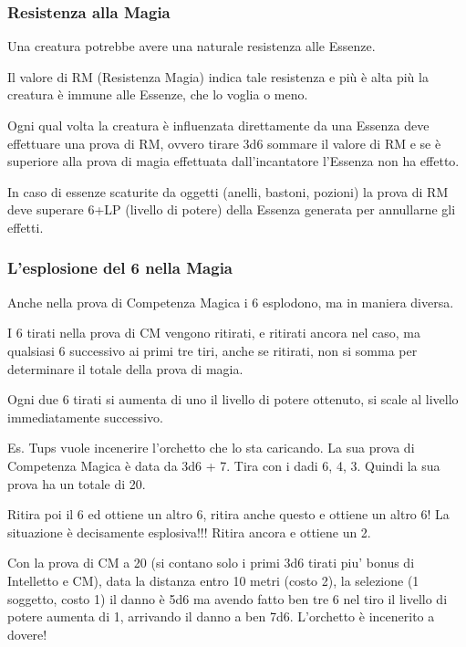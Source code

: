 \documentclass[a4paper,11pt,twoside,openany]{book}
\begin{document}
\subsubsection{Resistenza alla Magia}

Una creatura potrebbe avere una naturale resistenza alle Essenze.

Il valore di RM (Resistenza Magia) indica tale resistenza e più è alta più la creatura è immune alle Essenze, che lo voglia o meno.

Ogni qual volta la creatura è influenzata direttamente da una Essenza deve effettuare una prova di RM, ovvero tirare 3d6 sommare il valore di RM e se è superiore alla prova di magia effettuata dall'incantatore l'Essenza non ha effetto.

In caso di essenze scaturite da oggetti (anelli, bastoni, pozioni) la prova di RM deve superare 6+LP (livello di potere) della Essenza generata per annullarne gli effetti.

\subsubsection{L'esplosione del 6 nella Magia}

\label{lesplosione-del-6-nella-magia}

Anche nella prova di Competenza Magica i 6 esplodono, ma in maniera diversa.

I 6 tirati nella prova di CM vengono ritirati, e ritirati ancora nel caso, ma qualsiasi 6 successivo ai primi tre tiri, anche se ritirati, non si somma per determinare il totale della prova di magia.

Ogni due 6 tirati si aumenta di uno il livello di potere ottenuto, si scale al livello immediatamente successivo.

Es. Tups vuole incenerire l'orchetto che lo sta caricando. La sua prova di Competenza Magica è data da 3d6 + 7. Tira con i dadi 6, 4, 3. Quindi la sua prova ha un totale di 20.

Ritira poi il 6 ed ottiene un altro 6, ritira anche questo e ottiene un altro 6! La situazione è decisamente esplosiva!!! Ritira ancora e ottiene un 2.

Con la prova di CM a 20 (si contano solo i primi 3d6 tirati piu' bonus di Intelletto e CM), data la distanza entro 10 metri (costo 2), la selezione (1 soggetto, costo 1) il danno è 5d6 ma avendo fatto ben tre 6 nel tiro il livello di potere aumenta di 1, arrivando il danno a ben 7d6. L'orchetto è incenerito a dovere!
\end{document}
